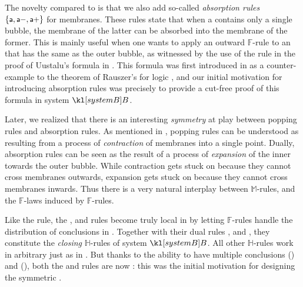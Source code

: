 \begin{description}
  The novelty compared to  is that we also add so-called
  \emph{absorption rules} $\{\text{\small$\mathsf{a}$},\text{\small$\mathsf{a{-}}$},\text{\small$\mathsf{a{+}}$}\}$ for membranes.
  These rules state that when a  contains only a single  bubble,
  the membrane of the latter can be absorbed into the membrane of the former.
  This is mainly useful when one wants to apply an outward $\mathbb{F}$-rule to
  an  that has the same  as the outer bubble, as witnessed by the
  use of the  rule in the proof of Uustalu's formula in
  . This formula was first introduced in
   as a counter-example to the 
  theorem of Rauszer's  for  logic
  , and our initial motivation for
  introducing absorption rules was precisely to provide a cut-free proof of this
  formula in system $\sysB$.

  Later, we realized that there is an interesting \emph{symmetry} at play
  between popping rules and absorption rules. As mentioned in
  , popping rules can be understood as resulting from a
  process of \emph{contraction} of membranes into a single point. Dually,
  absorption rules can be seen as the result of a process of \emph{expansion} of
  the inner  towards the outer bubble. While contraction gets stuck on
    because they cannot cross  membranes outwards,
  expansion gets stuck on   because they cannot cross 
  membranes inwards. Thus there is a very natural interplay between
  $\mathbb{M}$-rules, and the $\mathbb{F}$-laws induced by $\mathbb{F}$-rules.

  \item[\textbf{\heating}] 
  Like the  rule, the \rsf{\bot{-}}, \rsf{\lor{-}} and
  \rsf{{\limp}{-}} rules become truly local in  by letting
  $\mathbb{F}$-rules handle the distribution of conclusions in .
  Together with their dual rules \rsf{\top{+}}, \rsf{\land{+}} and
  \rsf{{\limp}{+}}, they constitute the \emph{closing} $\mathbb{H}$-rules of
  system $\sysB$. All other $\mathbb{H}$-rules work in arbitrary  just
  as in . But thanks to the ability to have multiple conclusions
  () and   (), both the
  \rsf{\lor{+}} and \rsf{{\limp}{+}} rules are now \emph{}: this was
  the initial motivation for designing the symmetric .
\end{description}